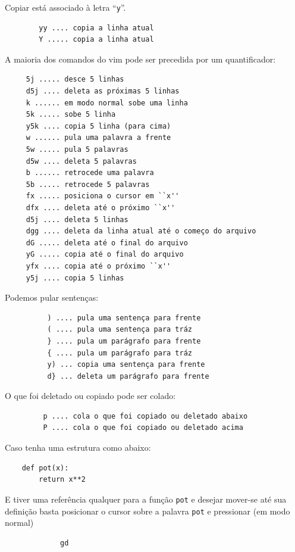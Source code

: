 \documentclass[10pt,a4paper,openany]{book}
\begin{document}
Copiar está associado à letra ``\verb|y|''.

\begin{verbatim}
		yy .... copia a linha atual
		Y ..... copia a linha atual
\end{verbatim}

A maioria dos comandos do vim pode ser precedida por um quantificador:

\begin{verbatim}
	 5j ..... desce 5 linhas
	 d5j .... deleta as próximas 5 linhas
	 k ...... em modo normal sobe uma linha
	 5k ..... sobe 5 linha
	 y5k .... copia 5 linha (para cima)
	 w ...... pula uma palavra a frente
	 5w ..... pula 5 palavras
	 d5w .... deleta 5 palavras
	 b ...... retrocede uma palavra
	 5b ..... retrocede 5 palavras
	 fx ..... posiciona o cursor em ``x''
	 dfx .... deleta até o próximo ``x''
	 d5j .... deleta 5 linhas
	 dgg .... deleta da linha atual até o começo do arquivo
	 dG ..... deleta até o final do arquivo
	 yG ..... copia até o final do arquivo
	 yfx .... copia até o próximo ``x''
	 y5j .... copia 5 linhas
\end{verbatim}

Podemos pular sentenças:

\begin{verbatim}
		  ) .... pula uma sentença para frente
		  ( .... pula uma sentença para tráz
		  } .... pula um parágrafo para frente
		  { .... pula um parágrafo para tráz
		  y) ... copia uma sentença para frente
		  d} ... deleta um parágrafo para frente
\end{verbatim}

O que foi deletado ou copiado pode ser colado:

\begin{verbatim}
		 p .... cola o que foi copiado ou deletado abaixo
		 P .... cola o que foi copiado ou deletado acima
\end{verbatim}

Caso tenha uma estrutura como abaixo:

\begin{verbatim}
	def pot(x):
		return x**2
\end{verbatim}

E tiver uma referência qualquer para a função \verb+pot+ e desejar
mover-se até sua definição basta posicionar o cursor sobre a palavra
\verb+pot+ e pressionar (em modo normal)

\begin{verbatim}
			 gd
\end{verbatim}
\end{document}
